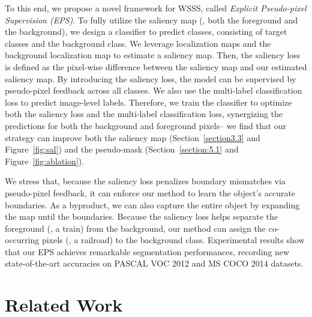 \documentclass[final]{cvpr}
\begin{document}
To this end, we propose a novel framework for WSSS, called \emph{Explicit Pseudo-pixel Supervision (EPS)}. To fully utilize the saliency map (\ie, both the foreground and the background), we design a classifier to predict  classes, consisting of  target classes and the background class. We leverage  localization maps and the background localization map to estimate a saliency map. Then, the saliency loss is defined as the pixel-wise difference between the saliency map and our estimated saliency map. By introducing the saliency loss, the model can be supervised by pseudo-pixel feedback across all classes. We also use the multi-label classification loss to predict image-level labels. Therefore, we train the classifier to optimize both the saliency loss and the multi-label classification loss, synergizing the predictions for both the background and foreground pixels-- we find that our strategy can improve both the saliency map (Section~\ref{section3.3} and Figure~\ref{fig:sal}) and the pseudo-mask (Section~\ref{section:5.1} and Figure~\ref{fig:ablation}). 


We stress that, because the saliency loss penalizes boundary mismatches via pseudo-pixel feedback, it can enforce our method to learn the object's accurate boundaries. As a byproduct, we can also capture the entire object by expanding the map until the boundaries. Because the saliency loss helps separate the foreground (\eg, a train) from the background, our method can assign the co-occurring pixels (\eg, a railroad) to the background class. Experimental results show that our EPS achieves remarkable segmentation performances, recording new state-of-the-art accuracies on PASCAL VOC 2012 and MS COCO 2014 datasets. 



\section{Related Work}
\end{document}
